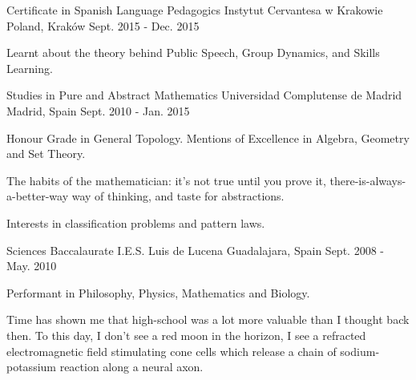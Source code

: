
\begin{cventries}
  \cventry
    {Certificate in Spanish Language Pedagogics} %
    {Instytut Cervantesa w Krakowie} %
    {Poland, Kraków} %
    {Sept. 2015 - Dec. 2015} %
    {
        \begin{cvitems} %
            \item {Learnt about the theory behind Public Speech, Group Dynamics, and Skills Learning.}
        \end{cvitems}
    }

\cventry
    {Studies in Pure and Abstract Mathematics} %
    {Universidad Complutense de Madrid} %
    {Madrid, Spain} %
    {Sept. 2010 - Jan. 2015} %
    {
        \begin{cvitems} %
            \item {Honour Grade in General Topology. Mentions of Excellence in Algebra, Geometry and Set Theory.}
            \item {The habits of the mathematician: it's not true until you prove it, there-is-always-a-better-way way of thinking, and taste for abstractions.}
            \item {Interests in classification problems and pattern laws.}
        \end{cvitems}
    }

\cventry
    {Sciences Baccalaurate} %
    {I.E.S. Luis de Lucena} %
    {Guadalajara, Spain} %
    {Sept. 2008 - May. 2010} %
    {
        \begin{cvitems} %
            \item {Performant in Philosophy, Physics, Mathematics and Biology.}
            \item {Time has shown me that high-school was a lot more valuable than I thought back then. To this day, I don't see a red moon in the horizon, I see a refracted electromagnetic field stimulating cone cells which release a chain of sodium-potassium reaction along a neural axon.}
        \end{cvitems}
    }

\end{cventries}
